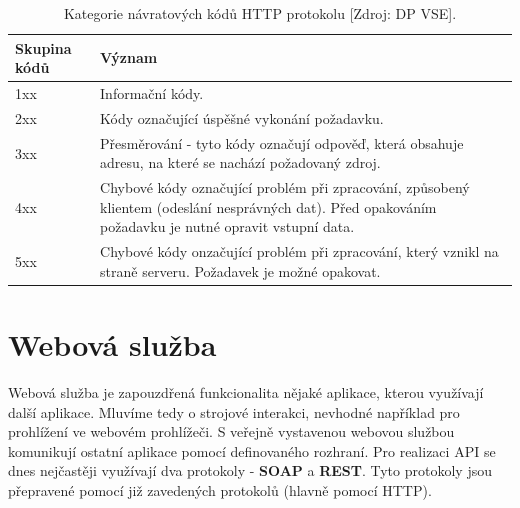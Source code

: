 \begin{table}[]
\centering
\begin{tabular}{lp{9cm}}
\textbf{Skupina kódů} & \textbf{Význam}\\ \midrule
1xx & Informační kódy.\\ \midrule
2xx & Kódy označující úspěšné vykonání požadavku.\\ \midrule
3xx & Přesměrování - tyto kódy označují odpověď, která obsahuje adresu, na které se nachází požadovaný zdroj.\\ \midrule
4xx & Chybové kódy označující problém při zpracování, způsobený klientem (odeslání nesprávných dat). Před opakováním požadavku je nutné opravit vstupní data.\\ \midrule
5xx & Chybové kódy onzačující problém při zpracování, který vznikl na straně serveru. Požadavek je možné opakovat.\\ \midrule
\end{tabular}
\caption{Kategorie návratových kódů HTTP protokolu [Zdroj: DP VSE].}
\label{tab:http_kody}
\end{table}


\section{Webová služba}

\indent

Webová služba je zapouzdřená funkcionalita nějaké aplikace, kterou využívají další aplikace.
Mluvíme tedy o strojové interakci, nevhodné například pro prohlížení ve webovém prohlížeči.
S veřejně vystavenou webovou službou komunikují ostatní aplikace pomocí definovaného rozhraní.
Pro realizaci API se dnes nejčastěji využívají dva protokoly - \textbf{SOAP} a \textbf{REST}.
Tyto protokoly jsou přepravené pomocí již zavedených protokolů (hlavně pomocí HTTP).